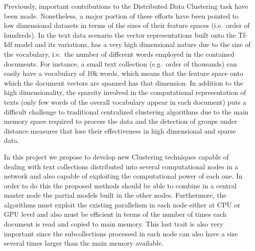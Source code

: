 \documentclass[10pt]{article}
\begin{document}
Previously, important contributions to the Distributed Data Clustering task have been made. Nonetheless, a major portion of these efforts have been pointed to low dimensional datasets in terms of the sizes of their feature spaces (i.e.\ order of hundreds). In the text data scenario the vector representations built onto the Tf-Idf model and its variations, has a very high dimensional nature due to the size of the vocabulary, i.e.\ the number of different words employed in the contained documents. For
instance, a small text collection (e.g.\ order of thousands) can easily have a vocabulary of 10k words, which means that the feature space onto which the document vectors are spanned has that dimension. In addition to the high dimensionality, the sparsity involved in the computational representation of texts (only few words of the overall vocabulary appear in each document) puts a difficult challenge to traditional centralized clustering algorithms due to the main memory space required to process the data and
the detection of groups under distance measures that lose their effectiveness in high dimensional and sparse data.


In this project we propose to develop new Clustering techniques capable of dealing with text collections distributed into several computational nodes in a network and also capable of exploiting the computational power of each one. In order to do this the proposed methods should be able to combine in a central master node the partial models built in the other nodes. Furthermore, the algorithms must exploit the existing parallelism in each node either at CPU or GPU level and also
must be efficient in terms of the number of times each document is read and copied to main memory. This last trait is also very important since the subcollections processed in each node can also have a size several times larger than the main memory available.
\end{document}

